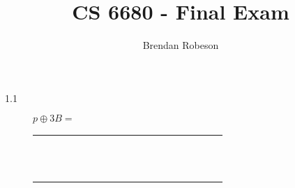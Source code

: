 \documentclass[fleqn]{article}
\begin{document}
\title{CS 6680 - Final Exam}
\author{Brendan Robeson}
\maketitle

\begin{description}

\item [1.1]
    \begin{math}p \oplus 3B =\end{math}

    \begin{tabular}{| c | c | c | c | c | c | c | c | c | c | c | c | c | c | c | c | c |}
        \hline
        & & & \cellcolor{gray} & \cellcolor{gray} & \cellcolor{gray} & \cellcolor{gray} & \cellcolor{gray} & \cellcolor{gray} & \cellcolor{gray} & & & & & & & \\ \hline
        & & & \cellcolor{gray} & \cellcolor{gray} & \cellcolor{gray} & \cellcolor{gray} & \cellcolor{gray} & \cellcolor{gray} & \cellcolor{gray} & & & & & & & \\ \hline
        & & & \cellcolor{gray} & \cellcolor{gray} & \cellcolor{gray} & \cellcolor{gray} & \cellcolor{gray} & \cellcolor{gray} & \cellcolor{gray} & & & & & & & \\ \hline
        & & & \cellcolor{gray} & \cellcolor{gray} & \cellcolor{gray} & \cellcolor{gray} & \cellcolor{gray} & \cellcolor{gray} & \cellcolor{gray} & & & & & & & \\ \hline
        & & & \cellcolor{gray} & \cellcolor{gray} & \cellcolor{gray} & \cellcolor{gray} & \cellcolor{gray} & \cellcolor{gray} & \cellcolor{gray} & & & & & & & \\ \hline
        & & & \cellcolor{gray} & \cellcolor{gray} & \cellcolor{gray} & \cellcolor{gray} & \cellcolor{gray} & \cellcolor{gray} & \cellcolor{gray} & & & & & & & \\ \hline
        & & & \cellcolor{gray} & \cellcolor{gray} & \cellcolor{gray} & \cellcolor{gray} & \cellcolor{gray} & \cellcolor{gray} & \cellcolor{gray} & & & & & & & \\ \hline
        & & & & & & & & & & & & & & & & \\ \hline
        & & & & & & & & & & & & & & & & \\ \hline
        & & & & & & & & & & & & & & & & \\ \hline
        & & & & & & & & & & & & & & & & \\ \hline
        & & & & & & & & & & & & & & & & \\ \hline
    \end{tabular}


\end{description}
\end{document}
